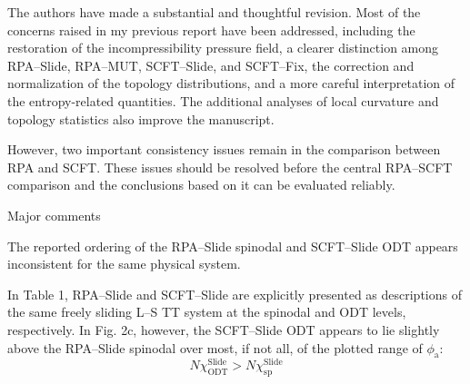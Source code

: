 \documentclass[../ResponsetoReviewers.tex]{subfiles}
\begin{document}
\begin{reviewersection}

\begin{reviewercomment}
    The authors have made a substantial and thoughtful revision.
    Most of the concerns raised in my previous report have been addressed, including the restoration of the incompressibility pressure field, a clearer distinction among RPA–Slide, RPA–MUT, SCFT–Slide, and SCFT–Fix, the correction and normalization of the topology distributions, and a more careful interpretation of the entropy-related quantities.
    The additional analyses of local curvature and topology statistics also improve the manuscript.


    However, two important consistency issues remain in the comparison between RPA and SCFT.
    These issues should be resolved before the central RPA–SCFT comparison and the conclusions based on it can be evaluated reliably.
\end{reviewercomment}


\begin{reviewergroup}{Major comments}

\begin{qa}
    The reported ordering of the RPA–Slide spinodal and SCFT–Slide ODT appears inconsistent for the same physical system.


    In Table 1, RPA–Slide and SCFT–Slide are explicitly presented as descriptions of the same freely sliding L–S TT system at the spinodal and ODT levels, respectively.
    In Fig. 2c, however, the SCFT–Slide ODT appears to lie slightly above the RPA–Slide spinodal over most, if not all, of the plotted range of $\phi_{\mathrm a}$:
    \begin{equation*}
        N\chi_{\text{ODT}}^{\text{Slide}} > N\chi_{\text{sp}}^{\text{Slide}}
    \end{equation*}



\end{qa}
\end{reviewergroup}
\end{reviewersection}
\end{document}
